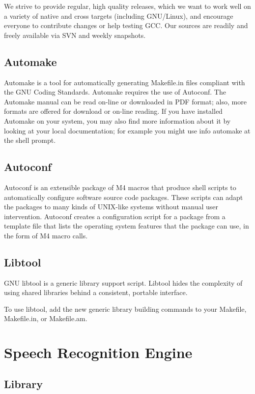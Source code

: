 \documentclass[12pt,a4paper,oldfontcommands]{memoir}
\begin{document}
We strive to provide regular, high quality releases, which we want to work well on a variety of native and cross targets (including GNU/Linux), and encourage everyone to contribute changes or help testing GCC. Our sources are readily and freely available via SVN and weekly snapshots\cite{16}.

\subsection{Automake} 
Automake is a tool for automatically generating Makefile.in files compliant with the GNU Coding Standards. Automake requires the use of Autoconf\cite{17}. The Automake manual can be read on-line or downloaded in PDF format; also, more formats are offered for download or on-line reading. If you have installed Automake on your system, you may also find more information about it by looking at your local documentation; for example you might use info automake at the shell prompt\cite{18}. 
 
\subsection{Autoconf}
Autoconf is an extensible package of M4 macros that produce shell scripts to automatically configure software source code packages. These scripts can adapt the packages to many kinds of UNIX-like systems without manual user intervention. Autoconf creates a configuration script for a package from a template file that lists the operating system features that the package can use, in the form of M4 macro calls\cite{19}.

\subsection{Libtool}
 GNU libtool is a generic library support script. Libtool hides the complexity of using shared libraries behind a consistent, portable interface.

To use libtool, add the new generic library building commands to your Makefile, Makefile.in, or Makefile.am\cite{19}.




\section{Speech Recognition Engine}
\subsection{Library}
\end{document}
